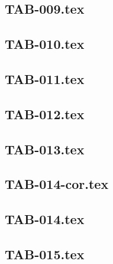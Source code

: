 \renewcommand{\xxexo}{TAB-009.tex} 
\subsection*{\xxexo} 
\graphicspath{{../../exostableaux/equadiffs/\xxexo/}}
 
 
\renewcommand{\xxexo}{TAB-010.tex} 
\subsection*{\xxexo} 
\graphicspath{{../../exostableaux/equadiffs/\xxexo/}}
 
 
\renewcommand{\xxexo}{TAB-011.tex} 
\subsection*{\xxexo} 
\graphicspath{{../../exostableaux/equadiffs/\xxexo/}}
 
 
\renewcommand{\xxexo}{TAB-012.tex} 
\subsection*{\xxexo} 
\graphicspath{{../../exostableaux/equadiffs/\xxexo/}}
 
 
\renewcommand{\xxexo}{TAB-013.tex} 
\subsection*{\xxexo} 
\graphicspath{{../../exostableaux/equadiffs/\xxexo/}}
 
 
\renewcommand{\xxexo}{TAB-014-cor.tex} 
\subsection*{\xxexo} 
\graphicspath{{../../exostableaux/equadiffs/\xxexo/}}
 
 
\renewcommand{\xxexo}{TAB-014.tex} 
\subsection*{\xxexo} 
\graphicspath{{../../exostableaux/equadiffs/\xxexo/}}
 
 
\renewcommand{\xxexo}{TAB-015.tex} 
\subsection*{\xxexo} 
\graphicspath{{../../exostableaux/equadiffs/\xxexo/}}
 
 
